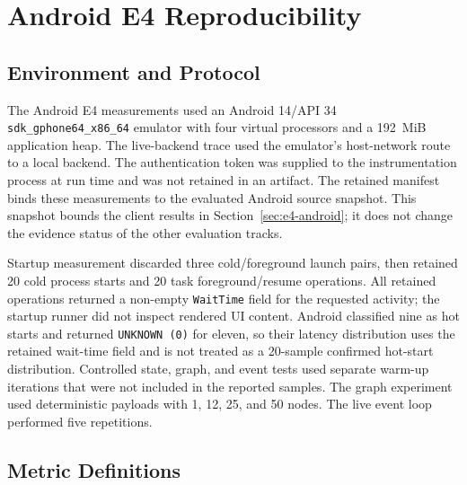 
\chapter{Android E4 Reproducibility}
\label{app:android-e4}

\section{Environment and Protocol}

The Android E4 measurements used an Android 14/API 34 \texttt{sdk\_gphone64\_x86\_64} emulator with four virtual processors and a 192~MiB application heap.
The live-backend trace used the emulator's host-network route to a local backend.
The authentication token was supplied to the instrumentation process at run time and was not retained in an artifact.
The retained manifest binds these measurements to the evaluated Android source snapshot.
This snapshot bounds the client results in Section~\ref{sec:e4-android}; it does not change the evidence status of the other evaluation tracks.

Startup measurement discarded three cold/foreground launch pairs, then retained 20 cold process starts and 20 task foreground/resume operations.
All retained operations returned a non-empty \texttt{WaitTime} field for the requested activity; the startup runner did not inspect rendered UI content.
Android classified nine as hot starts and returned \texttt{UNKNOWN (0)} for eleven, so their latency distribution uses the retained wait-time field and is not treated as a 20-sample confirmed hot-start distribution.
Controlled state, graph, and event tests used separate warm-up iterations that were not included in the reported samples.
The graph experiment used deterministic payloads with 1, 12, 25, and 50 nodes.
The live event loop performed five repetitions.

\section{Metric Definitions}

